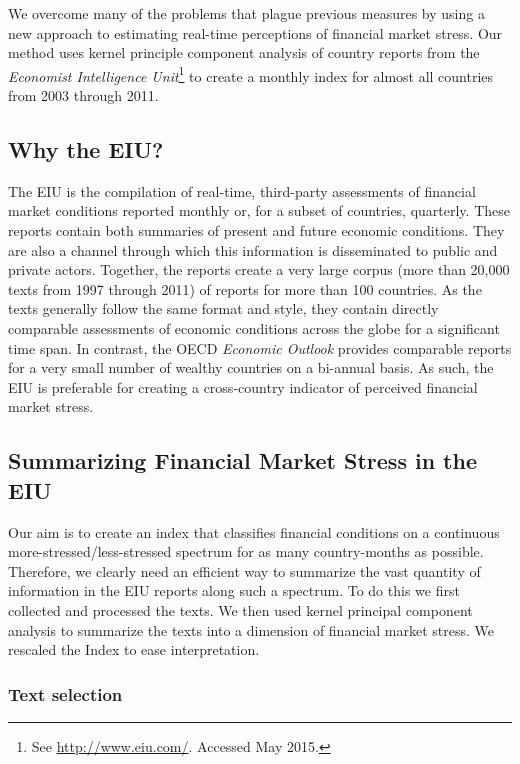 \documentclass[]{article}
\begin{document}
We overcome many of the problems that plague previous measures by using a new approach to estimating real-time perceptions of financial market stress. Our method uses kernel principle component analysis \citep{Scholkopf1998,lodhi2002,Spirling2012} of country reports from the \emph{Economist Intelligence Unit}\footnote{See \url{http://www.eiu.com/}. Accessed May 2015.} to create a monthly index for almost all countries from 2003 through 2011.

\subsection{Why the EIU?}\label{why-the-eiu}

The EIU is the compilation of real-time, third-party
assessments of financial market conditions reported monthly or, for a subset of countries, quarterly. These reports contain both summaries of
present and future economic conditions. They are also a channel through which this information is disseminated to public and private actors. Together, the reports create a very large corpus
(more than 20,000 texts from 1997 through 2011) of
reports for more than 100 countries. As the texts generally follow the
same format and style, they contain directly comparable assessments of
economic conditions across the globe for a significant time
span. In contrast, the OECD \emph{Economic Outlook} provides comparable
reports for a very small number of wealthy countries on a bi-annual
basis. As such, the EIU is preferable for creating a cross-country indicator of perceived financial market stress.

\subsection{Summarizing Financial Market Stress in the
EIU}\label{summarizing-financial-market-stress-in-the-eiu}

Our aim is to create an index that classifies financial conditions on a
continuous more-stressed/less-stressed spectrum for as many country-months as possible. Therefore, we clearly need an efficient way to summarize the vast quantity of information in the EIU reports along such a spectrum. To do this we first collected and processed the texts. We then used kernel principal component analysis to summarize the texts into a
dimension of financial market stress. We rescaled the Index to ease
interpretation.

\subsubsection{Text selection}\label{text-selection}
\end{document}

